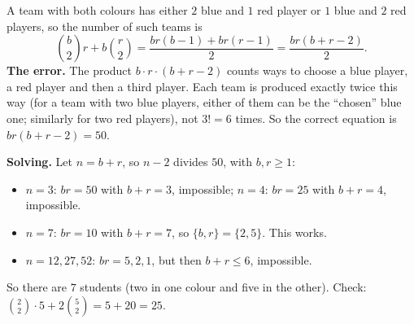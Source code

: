 A team with both colours has either $2$ blue and $1$ red player or $1$ blue and $2$ red players, so the number of such teams is
\[\binom b2r+b\binom r2=\dfrac{br(b-1)+br(r-1)}{2}=\dfrac{br(b+r-2)}{2}.\]
\textbf{The error.} The product $b\cdot r\cdot(b+r-2)$ counts ways to choose a blue player, a red player and then a third player. Each team is produced exactly twice this way (for a team with two blue players, either of them can be the ``chosen'' blue one; similarly for two red players), not $3!=6$ times. So the correct equation is $br(b+r-2)=50$.

\textbf{Solving.} Let $n=b+r$, so $n-2$ divides $50$, with $b,r\ge1$:
\begin{itemize}
\item $n=3$: $br=50$ with $b+r=3$, impossible; $n=4$: $br=25$ with $b+r=4$, impossible.
\item $n=7$: $br=10$ with $b+r=7$, so $\{b,r\}=\{2,5\}$. This works.
\item $n=12,27,52$: $br=5,2,1$, but then $b+r\le6$, impossible.
\end{itemize}
So there are $\boxed{7}$ students (two in one colour and five in the other). Check: $\binom22\cdot5+2\binom52=5+20=25$.
